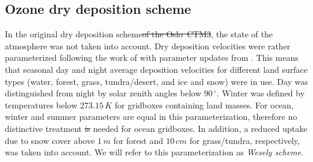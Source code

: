 \documentclass[gmd, manuscript]{copernicus}
\providecommand{\DIFadd}[1]{{\protect\color{blue}\uwave{#1}}} %
\providecommand{\DIFdel}[1]{{\protect\color{red}\sout{#1}}}                      %
\providecommand{\DIFaddbegin}{} %
\providecommand{\DIFaddend}{} %
\providecommand{\DIFdelbegin}{} %
\providecommand{\DIFdelend}{} %
\begin{document}
\subsection{Ozone dry deposition scheme}
\label{subsec:DryDep}
In the original dry deposition scheme\DIFdelbegin \DIFdel{of the Oslo~CTM3}\DIFdelend , the state of the atmosphere was not taken into account. Dry deposition velocities were rather parameterized following the work of \citet{AE:Wesely1989} with parameter updates from \citet{JGR:Hough1991}. This means that seasonal day and night average deposition velocities for different land surface types (water, forest, grass, tundra/desert, and ice and snow) were in use. Day was distinguished from night by solar zenith angles below $90\,\unit{^\circ}$. Winter was defined by temperatures below $273.15\,\unit{K}$ for gridboxes containing land masses. For ocean, winter and summer parameters are equal in this parameterization, therefore no distinctive treatment \DIFdelbegin \DIFdel{is }\DIFdelend \DIFaddbegin \DIFadd{was }\DIFaddend needed for ocean gridboxes. In addition, a reduced uptake due to snow cover above $1\,\unit{m}$ for forest and $10\,\unit{cm}$ for grass/tundra, respectively, was taken into account. We will refer to this parameterization as \emph{Wesely scheme}.\\
\end{document}
